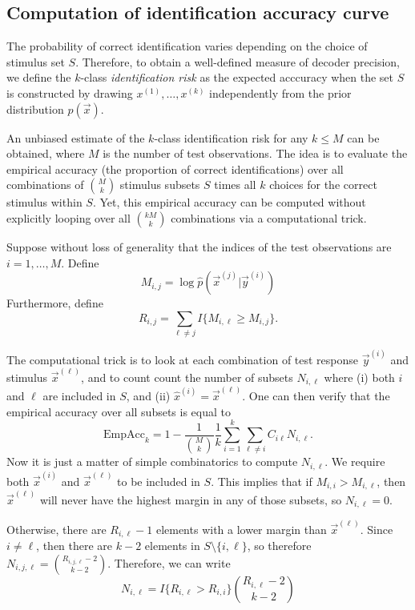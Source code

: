 \documentclass[12pt]{article}
\begin{document}
\subsection{Computation of identification accuracy curve}

The probability of correct identification varies depending on the choice of stimulus set $S$.  Therefore, to obtain a well-defined measure of decoder precision, we define the $k$-class \emph{identification risk} as the expected acccuracy when the set $S$ is constructed by drawing $x^{(1)},\hdots, x^{(k)}$ independently from the prior distribution $p(\vec{x})$.  

An unbiased estimate of the $k$-class identification risk for any $k \leq M$ can be obtained, where $M$ is the number of test observations.  The idea is to evaluate the empirical accuracy (the proportion of correct identifications) over all combinations of ${M}\choose{k}$ stimulus subsets $S$ times all $k$ choices for the correct stimulus within $S$.  Yet, this empirical accuracy can be computed without explicitly looping over all $k{M}\choose{k}$ combinations via a computational trick.

Suppose without loss of generality that the indices of the test observations are $i = 1,\hdots, M$.
Define
\[
M_{i,j} = \log \hat{p}(\vec{x}^{(j)}|\vec{y}^{(i)})
\]
Furthermore, define
\[
R_{i,j} = \sum_{\ell \neq j} I\{M_{i,\ell} \geq M_{i, j}\}.
\]

The computational trick is to look at each combination of test
response $\vec{y}^{(i)}$ and stimulus $\vec{x}^{(\ell)}$, and to count
count the number of subsets $N_{i, \ell}$ where (i) both $i$ and
$\ell$ are included in $S$, and (ii) $\hat{x}^{(i)} = \vec{x}^{(\ell)}$.
One can then verify that the empirical accuracy over all subsets is
equal to
\begin{equation}\label{eq:avtestrisk}
\text{EmpAcc}_k = 1 - \frac{1}{{{M}\choose{k}}}\frac{1}{k} \sum_{i=1}^{k} \sum_{\ell\neq i} C_{i\ell}N_{i, \ell}.
\end{equation}
Now it is just a matter of simple combinatorics to compute
$N_{i,\ell}$.  We require both $\vec{x}^{(i)}$ and $\vec{x}^{(\ell)}$ to be
included in $S$.  This implies that if $M_{i,i} > M_{i,\ell}$,
then $\vec{x}^{(\ell)}$ will never have the highest margin in any of those
subsets, so $N_{i,\ell} = 0$.

Otherwise, there are $R_{i,\ell} - 1$ elements
with a lower margin than $\vec{x}^{(\ell)}$.  Since $i \neq \ell$, then there
are $k-2$ elements in $S \setminus \{i, \ell\}$, so therefore $N_{i,
j, \ell} = {{R_{i,j,\ell} - 2}\choose{k - 2}}$.  Therefore, we can write
\begin{equation}\label{eq:avtestrisk_nil}
N_{i,\ell} = I\{R_{i,\ell} > R_{i,i}\}{{R_{i,\ell} -2}\choose{k - 2}}
\end{equation}
\end{document}
